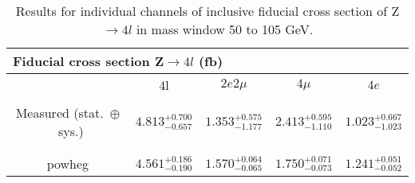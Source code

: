 \begin{table}[htbp]
      \caption{
Results for individual channels of inclusive fiducial cross section of Z$\rightarrow 4l$ in mass window 50 to 105 GeV. \label{tab:z4l_results}
        }
\begin{tabular}{|c|c|c|c|c|}
\hline %
\hline %
\multicolumn{5}{|l|}{ Fiducial cross section Z$\rightarrow 4l$ (fb) } \\
\hline %
& 4l & $2e2\mu$ & $4\mu$ & $4e$ \\
\hline %
\vspace{-0.4cm} &&&&\\
Measured (stat.~$\oplus$~sys.)
&$4.813^{+0.700}_{-0.657}$
&$1.353^{+0.575}_{-1.177}$
&$2.413^{+0.595}_{-1.110}$
&$1.023^{+0.667}_{-1.023}$
\\
\vspace{-0.4cm} &&&&\\
\hline %
\vspace{-0.4cm} &&&&\\
\small {\sc powheg}
&$4.561^{+0.186}_{-0.190}$
&$1.570^{+0.064}_{-0.065}$
&$1.750^{+0.071}_{-0.073}$
&$1.241^{+0.051}_{-0.052}$
\\
\hline %
\end{tabular}
\end{table}



